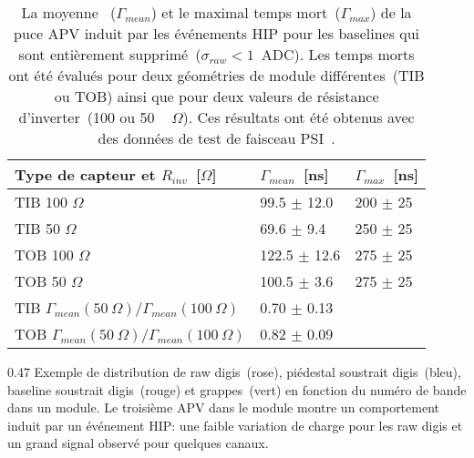 \begin{table}[h]
\begin{center}
\begin{tabular}{|l|l|l|}
\hline
Type de capteur et $R_{inv}$~[$\Omega$] & $\Gamma_{mean}$~[ns]  & $\Gamma_{max}$~[ns] \\
\hline
\hline
TIB 100 $\Omega$ & 99.5 $\pm$ 12.0 & 200 $\pm$ 25 \\
TIB 50  $\Omega$ & 69.6 $\pm$ 9.4 & 250 $\pm$ 25 \\
TOB 100  $\Omega$ & 122.5 $\pm$ 12.6 & 275 $\pm$ 25 \\
TOB 50 $\Omega$  & 100.5 $\pm$ 3.6 & 275 $\pm$ 25 \\
\hline
TIB $\Gamma_{mean}(50~\Omega )/\Gamma_{mean}(100~\Omega)$ &  0.70 $\pm$ 0.13  & \\
TOB $\Gamma_{mean}(50~\Omega )/\Gamma_{mean}(100~\Omega)$ &  0.82 $\pm$ 0.09 & \\
\hline
\end{tabular}
\caption[Table caption text]{La moyenne~ ($\Gamma_{mean} $) et le maximal temps mort~($\Gamma_{max}$) de la puce APV induit par les événements HIP pour les baselines qui sont entièrement supprimé~($\sigma_{raw} <1 $~ADC). Les temps morts ont été évalués pour deux géométries de module différentes~(TIB ou TOB) ainsi que pour deux valeurs de résistance d'inverter~(100 ou 50 ~ $\Omega$). Ces résultats ont été obtenus avec des données de test de faisceau PSI~\cite{Bainbridge: 2004jc}.}
\label{tab:tableDeadtimes2}
\end{center}
\end{table}


                 {0.47}
                 {Exemple de distribution de raw digis~(rose), piédestal soustrait digis~(bleu), baseline soustrait digis~(rouge) et grappes~(vert) en fonction du numéro de bande dans un module. Le troisième APV dans le module montre un comportement induit par un événement HIP: une faible variation de charge pour les raw digis et un grand signal observé pour quelques canaux.}       %

